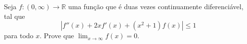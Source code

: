 Seja \(f \colon (0,\infty) \to \mathbb{R}\) uma função que é duas vezes continuamente diferenciável, tal que
\[
|f''(x) + 2x f'(x) + (x^2 + 1) f(x)| \le 1
\]
para todo \(x\). Prove que \(\lim_{x \to \infty} f(x) = 0\).
